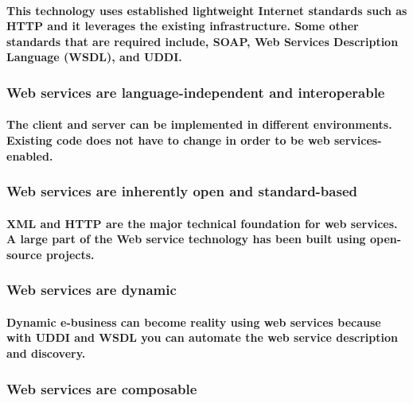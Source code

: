 \documentclass[12pt,a4paper]{article}
\begin{document}
    \paragraph{This technology uses established lightweight Internet standards such as HTTP and it leverages the existing infrastructure. Some other standards that are required include, SOAP, Web Services Description Language (WSDL), and UDDI.
    }

    \subsubsection{Web services are language-independent and interoperable}

    \paragraph{The client and server can be implemented in different environments. Existing code does not have to change in order to be web services-enabled.
    }

    \subsubsection{Web services are inherently open and standard-based}

    \paragraph{XML and HTTP are the major technical foundation for web services. A large part of the Web service technology has been built using open-source projects.
    }
    
    \subsubsection{Web services are dynamic}

    \paragraph{Dynamic e-business can become reality using web services because with UDDI and WSDL you can automate the web service description and discovery.
    }
    
    \subsubsection{Web services are composable}
\end{document}
